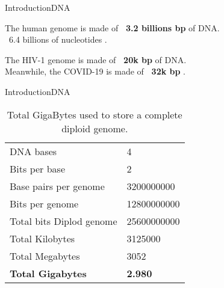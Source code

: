 \documentclass[10pt]{beamer}
\newcommand{\1}{
	\setbeamertemplate{background}{
		\texttt{[image: img/1\_dna]}
		\tikz[overlay] \fill[fill opacity=0.75,fill=white] (0,0) rectangle (-\paperwidth,\paperheight);
	}
}
\begin{document}
\begin{frame}{Introduction}{DNA}
	\begin{block}{}
		\centering
		The human genome is made of \textbf{\string ~3.2 billions bp} of DNA. \\
		\string ~6.4 billions of nucleotides \cite{archibald2018genomics}.
	\end{block}
	
	\begin{block}{}
		\centering
		The HIV-1 genome is made of \textbf{\string ~20k bp} of DNA. \\
		Meanwhile, the COVID-19 is made of \textbf{\string ~32k bp} \cite{randhawa2020machine}.
	\end{block}	
\end{frame}

\begin{frame}{Introduction}{DNA}
\begin{table}[]
	\caption{Total GigaBytes used to store a complete diploid genome.}
	\begin{tabular}{ll}
		\hline
		DNA bases                & 4           \\
		Bits per base            & 2           \\
		Base pairs per genome    & 3200000000  \\
		Bits per genome          & 12800000000 \\
		Total bits Diplod genome & 25600000000 \\
		Total Kilobytes          & 3125000     \\
		Total Megabytes          & 3052        \\
		\hline
		\textbf{Total Gigabytes}          & \textbf{2.980}      \\
		\hline
	\end{tabular}
\end{table}
\end{frame}

\end{document}
